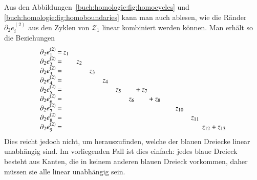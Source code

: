 Aus den Abbildungen~\ref{buch:homologie:fig:homocycles} und
\ref{buch:homologie:fig:homoboundaries} kann man auch ablesen,
wie die Ränder $\partial_2e_i^{(2)}$ aus den Zyklen von $\mathcal{Z}_1$
linear kombiniert werden können.
Man erhält so die Beziehungen
\begin{equation}
\setcounter{MaxMatrixCols}{29}
\setlength\arraycolsep{1pt}
\begin{array}{lcrcrcrcrcrcrcrcrcrcrcrcrcr}
\partial_2e_1^{(2)} &=&z_1& &   & &   & &   & &   & &   & &   & &   & &   & &      & &      & &      & &      \\
\partial_2e_2^{(2)} &=&   & &z_2& &   & &   & &   & &   & &   & &   & &   & &      & &      & &      & &      \\
\partial_2e_3^{(2)} &=&   & &   & &z_3& &   & &   & &   & &   & &   & &   & &      & &      & &      & &      \\
\partial_2e_4^{(2)} &=&   & &   & &   & &z_4& &   & &   & &   & &   & &   & &      & &      & &      & &      \\
\partial_2e_5^{(2)} &=&   & &   & &   & &   & &z_5& &   &+&z_7& &   & &   & &      & &      & &      & &      \\
\partial_2e_6^{(2)} &=&   & &   & &   & &   & &   & &z_6& &   &+&z_8& &   & &      & &      & &      & &      \\
\partial_2e_7^{(2)} &=&   & &   & &   & &   & &   & &   & &   & &   & &   & &z_{10}& &      & &      & &      \\
\partial_2e_8^{(2)} &=&   & &   & &   & &   & &   & &   & &   & &   & &   & &      & &z_{11}& &      & &      \\
\partial_2e_9^{(2)} &=&   &\phantom{+}&   &\phantom{+} &   &\phantom{+} &   &\phantom{+} &   &\phantom{+} &   &\phantom{+} &   &\phantom{+} &   &\phantom{+} &   &\phantom{+} &      &\phantom{+} &      & &z_{12}&+&z_{13}
\end{array}
\end{equation}
Dies reicht jedoch nicht, um herauszufinden, welche der blauen Dreiecke
linear unabhängig sind.
Im vorliegenden Fall ist dies einfach: jedes blaue Dreieck besteht aus
Kanten, die in keinem anderen blauen Dreieck vorkommen, daher müssen
sie alle linear unabhängig sein.


